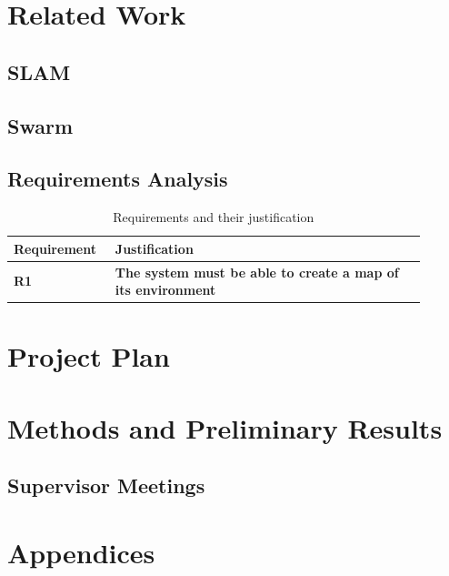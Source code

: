 \documentclass[12pt]{article}
\begin{document}
\section{Related Work}
\subsection{SLAM}
\subsection{Swarm}

\subsection{Requirements Analysis}
\begin{table}[h!]
    \centering
    \begin{tabular}{|p{0.2\linewidth}|p{0.7\linewidth}|}
        \hline
        \textbf{Requirement} & \textbf{Justification}\\
        \hline
        \textbf{R1} & \textbf{The system must be able to create a map of its environment}\\
        \hline
    \end{tabular}
    \caption{Requirements and their justification}\label{tab:table}
\end{table}


\section{Project Plan}
\lipsum[6-7]

\section{Methods and Preliminary Results}
\lipsum[8-9]

\subsection{Supervisor Meetings}
\lipsum[10]

\section{Appendices}
\lipsum[11-12]
\end{document}
